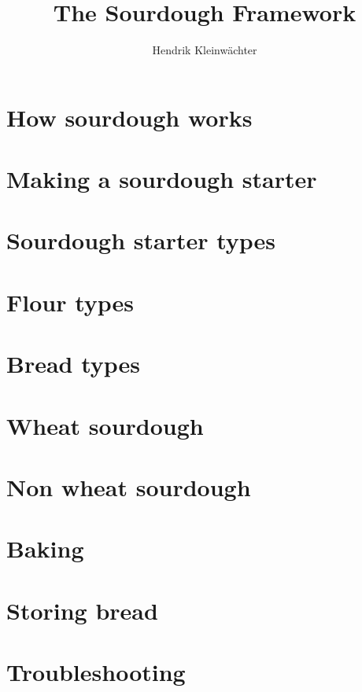 \documentclass[paper=a4, twoside=false, fontsize=12pt, parskip=half,
                bibliography=totoc, listof=totoc]{scrbook}
\author{Hendrik Kleinwächter}
\title{The Sourdough Framework}
\begin{document}

\titlepage

\frontmatter
\ifdefined\HCode\else\tableofcontents\fi





\mainmatter



\chapter{How sourdough works}


\chapter{Making a sourdough starter}


\chapter{Sourdough starter types}


\chapter{Flour types}


\chapter{Bread types}


\chapter{Wheat sourdough}%
\label{chapter:wheat-sourdough}


\chapter{Non wheat sourdough}%
\label{chapter:non-wheat-sourdough}



\chapter{Baking}%
\label{chapter:baking}


\chapter{Storing bread}%
\label{chapter:storing-bread}


\chapter{Troubleshooting}


\backmatter
\printbibliography
\listofflowcharts
\listoftables
\listoffigures
\end{document}
